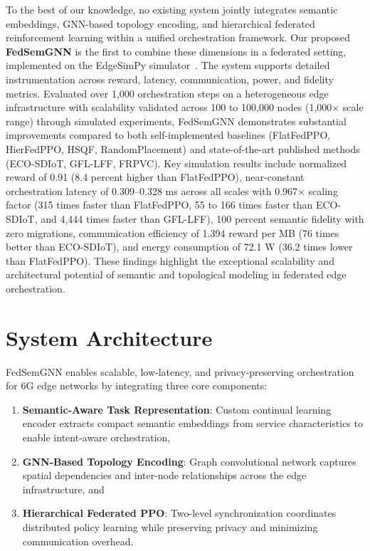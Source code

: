 \documentclass[conference]{IEEEtran}
\begin{document}
	To the best of our knowledge, no existing system jointly integrates semantic embeddings, GNN-based topology encoding, and hierarchical federated reinforcement learning within a unified orchestration framework. Our proposed \textbf{FedSemGNN} is the first to combine these dimensions in a federated setting, implemented on the EdgeSimPy simulator~\cite{Souza2023_EdgeSimPy}. The system supports detailed instrumentation across reward, latency, communication, power, and fidelity metrics. Evaluated over 1,000 orchestration steps on a heterogeneous edge infrastructure with scalability validated across 100 to 100,000 nodes (1,000$\times$ scale range) through simulated experiments, FedSemGNN demonstrates substantial improvements compared to both self-implemented baselines (FlatFedPPO, HierFedPPO, HSQF, RandomPlacement) and state-of-the-art published methods (ECO-SDIoT, GFL-LFF, FRPVC). Key simulation results include normalized reward of 0.91 (8.4 percent higher than FlatFedPPO), near-constant orchestration latency of 0.309--0.328 ms across all scales with 0.967$\times$ scaling factor (315 times faster than FlatFedPPO, 55 to 166 times faster than ECO-SDIoT, and 4,444 times faster than GFL-LFF), 100 percent semantic fidelity with zero migrations, communication efficiency of 1.394 reward per MB (76 times better than ECO-SDIoT), and energy consumption of 72.1 W (36.2 times lower than FlatFedPPO). These findings highlight the exceptional scalability and architectural potential of semantic and topological modeling in federated edge orchestration.
	
	
	\section{System Architecture}
	\label{sec:system_architecture}
	
	FedSemGNN enables scalable, low-latency, and privacy-preserving orchestration for 6G edge networks by integrating three core components:
	
	\begin{enumerate}
		\item \textbf{Semantic-Aware Task Representation}: Custom continual learning encoder extracts compact semantic embeddings from service characteristics to enable intent-aware orchestration,
		\item \textbf{GNN-Based Topology Encoding}: Graph convolutional network captures spatial dependencies and inter-node relationships across the edge infrastructure, and
		\item \textbf{Hierarchical Federated PPO}: Two-level synchronization coordinates distributed policy learning while preserving privacy and minimizing communication overhead.
	\end{enumerate}
	
\end{document}

